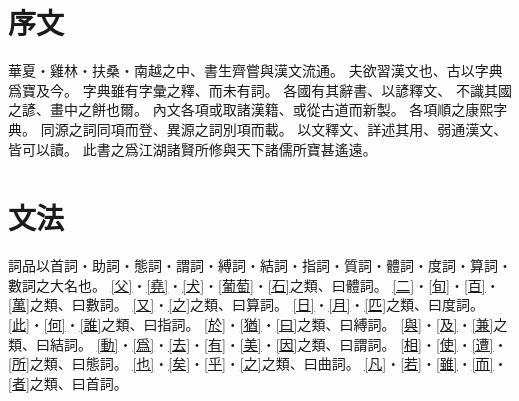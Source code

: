 \chapter*{序文}
華夏・雞林・扶桑・南越之中、書生齊嘗與漢文流通。
夫欲習漢文也、古以字典爲寶及今。
字典雖有字彙之釋、而未有詞。
各國有其辭書、以諺釋文、
不識其國之諺、畫中之餅也爾。
內文各項或取諸漢籍、或從古道而新製。
各項順之康熙字典。
同源之詞同項而登、異源之詞別項而載。
以文釋文、詳述其用、弱通漢文、皆可以讀。
此書之爲江湖諸賢所修與天下諸儒所寶甚遙遠。
\chapter*{文法}
詞品以首詞・助詞・態詞・謂詞・縛詞・結詞・指詞・質詞・體詞・度詞・算詞・數詞之大名也。
\cref{父}・\cref{堯}・\cref{犬}・\cref{葡萄}・\cref{石}之類、曰體詞。
\cref{二}・\cref{旬}・\cref{百}・\cref{萬}之類、曰數詞。
\cref{又}・\cref{之}之類、曰算詞。
\cref{日}・\cref{月}・\cref{匹}之類、曰度詞。
\cref{此}・\cref{何}・\cref{誰}之類、曰指詞。
\cref{於}・\cref{猶}・\cref{曰}之類、曰縛詞。
\cref{與}・\cref{及}・\cref{兼}之類、曰結詞。
\cref{動}・\cref{爲}・\cref{去}・\cref{有}・\cref{美}・\cref{因}之類、曰謂詞。
\cref{相}・\cref{使}・\cref{遭}・\cref{所}之類、曰態詞。
\cref{也}・\cref{矣}・\cref{乎}・\cref{之}之類、曰曲詞。
\cref{凡}・\cref{若}・\cref{雖}・\cref{而}・\cref{者}之類、曰首詞。
